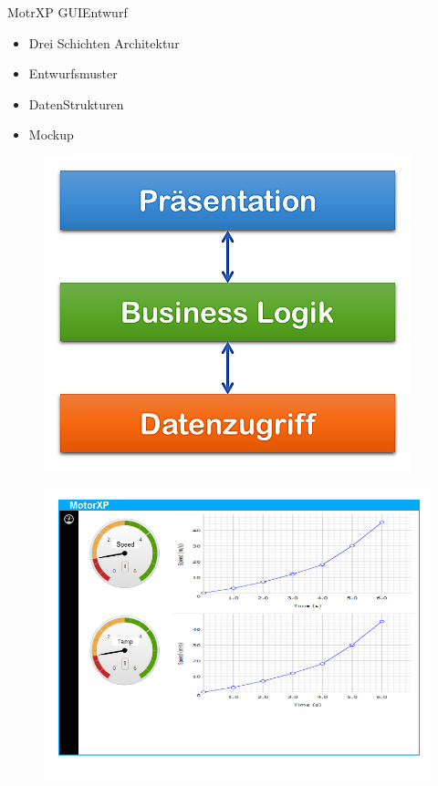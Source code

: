 		\begin{frame}{MotrXP GUI}{Entwurf}
		\begin{minipage}{0.6\textwidth}
			\begin{itemize}
				\item Drei Schichten Architektur
	   	 		\item Entwurfsmuster
	    		\item DatenStrukturen
	    		\item Mockup
	  		\end{itemize}
		\end{minipage}
		\hfill
	  		\begin{minipage}{0.3\textwidth}
	  			\begin{figure}[htbp]
	  				\centering
	  				\includegraphics[width=\textwidth]{../gui/Bilder/Arc1.png}
	  			\end{figure}
	  			\begin{figure}[h]
	  				\centering
	  				\includegraphics[width=\textwidth]{../gui/Bilder/Mockup.png}
	  			\end{figure}
	  		\end{minipage}
	  		
	  		
		\end{frame}

